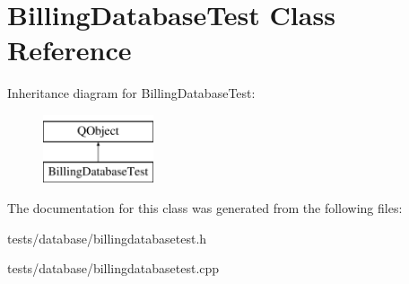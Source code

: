 \hypertarget{classBillingDatabaseTest}{}\section{Billing\+Database\+Test Class Reference}
\label{classBillingDatabaseTest}
Inheritance diagram for Billing\+Database\+Test\+:\begin{figure}[H]
\begin{center}
\leavevmode
\includegraphics[height=2.000000cm]{d1/db1/classBillingDatabaseTest}
\end{center}
\end{figure}


The documentation for this class was generated from the following files\+:\begin{DoxyCompactItemize}
\item 
tests/database/billingdatabasetest.\+h\item 
tests/database/billingdatabasetest.\+cpp\end{DoxyCompactItemize}
